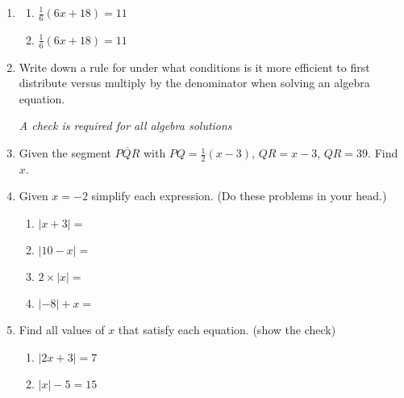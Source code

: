 \begin{enumerate}
\item 
  \begin{multicols}{2}
    \begin{enumerate}
      \item $\frac{1}{6}(6x+18)=11$
      \item $\frac{1}{6}(6x+18)=11$
    \end{enumerate}
  \end{multicols} \vspace{3cm}

\item Write down a rule for under what conditions is it more efficient to first distribute versus multiply by the denominator when solving an algebra equation.

\newpage
\emph{A check is required for all algebra solutions}
\item Given the segment $\overline{PQR}$ with $PQ=\frac{1}{2}(x-3)$, $QR=x-3$, $QR=39$. Find $x$. \medskip
\begin{flushleft}
\end{flushleft} \vspace{6cm}

\item Given $x=-2$ simplify each expression. (Do these problems in your head.)
  \begin{multicols}{2}
    \begin{enumerate}[itemsep=1cm]
      \item $|x+3|=$
      \item $|10-x|=$
      \item $2 \times |x|=$
      \item $|-8|+x=$
    \end{enumerate}
  \end{multicols} \bigskip

\item Find all values of $x$ that satisfy each equation. (show the check) \bigskip
  \begin{multicols}{2} 
    \begin{enumerate}
      \item $|2x+3|=7$
      \item $|x|-5=15$
    \end{enumerate}
  \end{multicols}


\end{enumerate}
